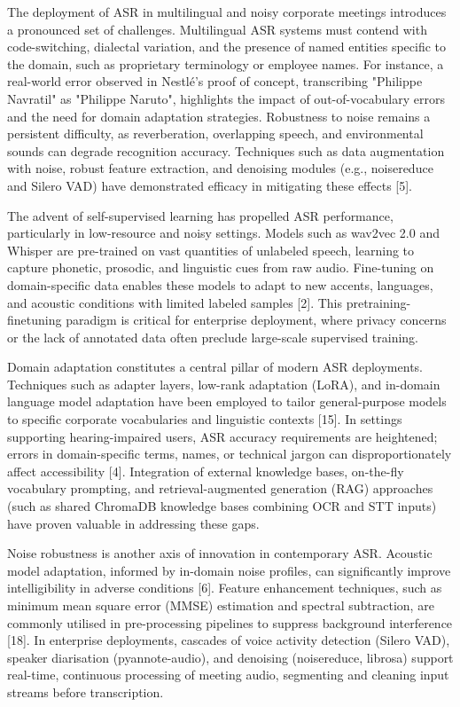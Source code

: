 \documentclass[12pt,a4paper]{article}
\begin{document}
The deployment of ASR in multilingual and noisy corporate meetings introduces a pronounced set of challenges. Multilingual ASR systems must contend with code-switching, dialectal variation, and the presence of named entities specific to the domain, such as proprietary terminology or employee names. For instance, a real-world error observed in Nestlé’s proof of concept, transcribing "Philippe Navratil" as "Philippe Naruto", highlights the impact of out-of-vocabulary errors and the need for domain adaptation strategies. Robustness to noise remains a persistent difficulty, as reverberation, overlapping speech, and environmental sounds can degrade recognition accuracy. Techniques such as data augmentation with noise, robust feature extraction, and denoising modules (e.g., noisereduce and Silero VAD) have demonstrated efficacy in mitigating these effects [5].


The advent of self-supervised learning has propelled ASR performance, particularly in low-resource and noisy settings. Models such as wav2vec 2.0 and Whisper are pre-trained on vast quantities of unlabeled speech, learning to capture phonetic, prosodic, and linguistic cues from raw audio. Fine-tuning on domain-specific data enables these models to adapt to new accents, languages, and acoustic conditions with limited labeled samples [2]. This pretraining-finetuning paradigm is critical for enterprise deployment, where privacy concerns or the lack of annotated data often preclude large-scale supervised training.


Domain adaptation constitutes a central pillar of modern ASR deployments. Techniques such as adapter layers, low-rank adaptation (LoRA), and in-domain language model adaptation have been employed to tailor general-purpose models to specific corporate vocabularies and linguistic contexts [15]. In settings supporting hearing-impaired users, ASR accuracy requirements are heightened; errors in domain-specific terms, names, or technical jargon can disproportionately affect accessibility [4]. Integration of external knowledge bases, on-the-fly vocabulary prompting, and retrieval-augmented generation (RAG) approaches (such as shared ChromaDB knowledge bases combining OCR and STT inputs) have proven valuable in addressing these gaps.


Noise robustness is another axis of innovation in contemporary ASR. Acoustic model adaptation, informed by in-domain noise profiles, can significantly improve intelligibility in adverse conditions [6]. Feature enhancement techniques, such as minimum mean square error (MMSE) estimation and spectral subtraction, are commonly utilised in pre-processing pipelines to suppress background interference [18]. In enterprise deployments, cascades of voice activity detection (Silero VAD), speaker diarisation (pyannote-audio), and denoising (noisereduce, librosa) support real-time, continuous processing of meeting audio, segmenting and cleaning input streams before transcription.
\end{document}
